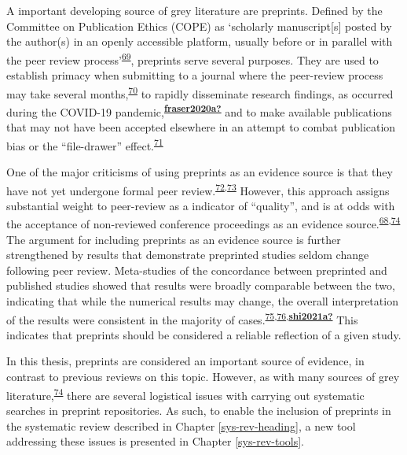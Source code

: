 \documentclass[a4paper, twoside]{templates/ociamthesis}
\begin{document}
A important developing source of grey literature are preprints. Defined by the Committee on Publication Ethics (COPE) as `scholarly manuscript{[}s{]} posted by the author(s) in an openly accessible platform, usually before or in parallel with the peer review process'\textsuperscript{\protect\hyperlink{ref-committeeonpublicationethicscope2018}{69}}, preprints serve several purposes. They are used to establish primacy when submitting to a journal where the peer-review process may take several months,\textsuperscript{\protect\hyperlink{ref-vale2016}{70}} to rapidly disseminate research findings, as occurred during the COVID-19 pandemic,\textsuperscript{\protect\hyperlink{ref-fraser2020a}{\textbf{fraser2020a?}}} and to make available publications that may not have been accepted elsewhere in an attempt to combat publication bias or the ``file-drawer'' effect.\textsuperscript{\protect\hyperlink{ref-rosenthal1979}{71}}

One of the major criticisms of using preprints as an evidence source is that they have not yet undergone formal peer review.\textsuperscript{\protect\hyperlink{ref-maslove2018}{72},\protect\hyperlink{ref-schalkwyk2020}{73}} However, this approach assigns substantial weight to peer-review as a indicator of ``quality'', and is at odds with the acceptance of non-reviewed conference proceedings as an evidence source.\textsuperscript{\protect\hyperlink{ref-lefebvre2019searching}{68},\protect\hyperlink{ref-mahood2014}{74}} The argument for including preprints as an evidence source is further strengthened by results that demonstrate preprinted studies seldom change following peer review. Meta-studies of the concordance between preprinted and published studies showed that results were broadly comparable between the two, indicating that while the numerical results may change, the overall interpretation of the results were consistent in the majority of cases.\textsuperscript{\protect\hyperlink{ref-klein2019}{75},\protect\hyperlink{ref-nicholson2021}{76},\protect\hyperlink{ref-shi2021a}{\textbf{shi2021a?}}} This indicates that preprints should be considered a reliable reflection of a given study.

In this thesis, preprints are considered an important source of evidence, in contrast to previous reviews on this topic. However, as with many sources of grey literature,\textsuperscript{\protect\hyperlink{ref-mahood2014}{74}} there are several logistical issues with carrying out systematic searches in preprint repositories. As such, to enable the inclusion of preprints in the systematic review described in Chapter \ref{sys-rev-heading}, a new tool addressing these issues is presented in Chapter \ref{sys-rev-tools}.
\end{document}
